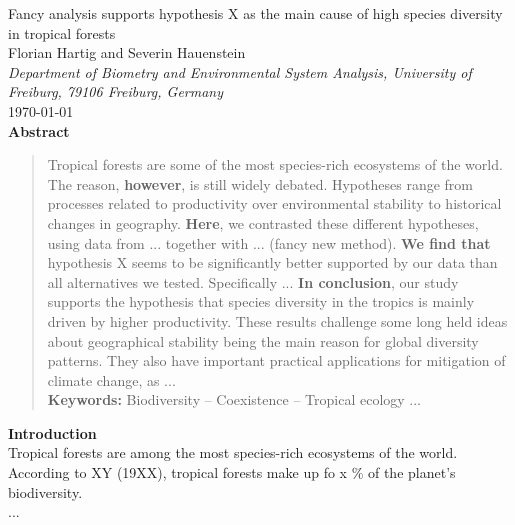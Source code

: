 \documentclass{tufte-book}
\begin{document}
\begin{center}
	\huge{Fancy analysis supports hypothesis X as the main cause of high species diversity in tropical forests} \\ 
	\vspace{0.3em}
	\large{Florian Hartig and Severin Hauenstein}\\
	\vspace{0.3em}
	\small{\textit{Department of Biometry and Environmental System Analysis, University of Freiburg, 79106 Freiburg, Germany}}\\
	\vspace{1em}
	\large{\today}\\
	\vspace{2em}
	\textbf{Abstract}\\ 
\end{center}
\begin{quote}
Tropical forests are some of the most species-rich ecosystems of the world.
The reason, \textbf{however}, is still widely debated. Hypotheses range from processes related to productivity over environmental stability to historical changes in geography.
\textbf{Here}, we contrasted these different hypotheses, using data from ... together with ... (fancy new method).
\textbf{We find that} hypothesis X seems to be significantly better supported by our data
than all alternatives we tested. Specifically ... 
\textbf{In conclusion}, our study supports the hypothesis that species diversity in the
tropics is mainly driven by higher productivity. These results challenge some long held
ideas about geographical stability being the main reason for global diversity
patterns. They also have important practical applications for mitigation of climate
change, as ...\\[0.3cm]
\noindent\textbf{Keywords:} Biodiversity -- Coexistence -- Tropical ecology ...\\
\end{quote}

\noindent\textbf{Introduction}\\
Tropical forests are among the most species-rich ecosystems of the world. According to XY (19XX), tropical forests make up fo x \% of the planet's biodiversity.\\
...
\end{document}
